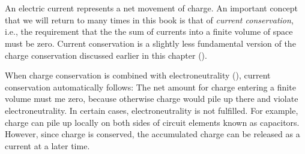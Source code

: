 \section{}
\label{sec:Basics:Current} 
An electric current represents a net movement of charge. An important concept that we will return to many times in this book is that of {\it current conservation}, i.e., the requirement that the the sum of currents into a finite volume of space must be zero. Current conservation is a slightly less fundamental version of the charge conservation discussed earlier in this chapter (). 

When charge conservation is combined with electroneutrality (), current conservation automatically follows: The net amount for charge entering a finite volume must me zero, because otherwise charge would pile up there and violate electroneutrality. In certain cases, electroneutrality is not fulfilled. For example, charge can pile up locally on both sides of circuit elements known as capacitors. However, since charge is conserved, the accumulated charge can be released as a current at a later time. 

